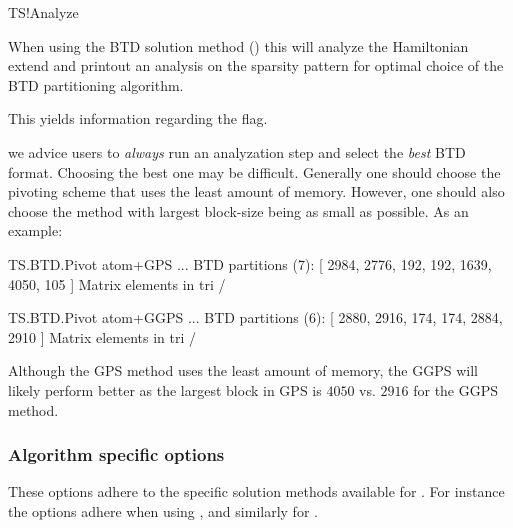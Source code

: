 \begin{fdflogicalF}{TS!Analyze}

  When using the BTD solution method () this
  will analyze the Hamiltonian extend and printout an analysis on the
  sparsity pattern for optimal choice of the BTD partitioning
  algorithm. 

  This yields information regarding the  flag.

  \note we advice users to \emph{always} run an analyzation step and
  select the \emph{best} BTD format. Choosing the best one may be
  difficult. Generally one should choose the pivoting scheme that uses
  the least amount of memory. However, one should also choose the
  method with largest block-size being as small as possible. As an
  example:
  \begin{shellexample}
TS.BTD.Pivot atom+GPS
...
    BTD partitions (7): 
     [ 2984, 2776, 192, 192, 1639, 4050, 105 ]
    Matrix elements in tri / %

TS.BTD.Pivot atom+GGPS
...
    BTD partitions (6): 
     [ 2880, 2916, 174, 174, 2884, 2910 ]
    Matrix elements in tri / %

  \end{shellexample}
  Although the GPS method uses the least amount of memory, the GGPS
  will likely perform better as the largest block in GPS is $4050$
  vs. $2916$ for the GGPS method. 

\end{fdflogicalF}


\subsubsection{Algorithm specific options}

These options adhere to the specific solution methods available for
\tsiesta. For instance the  options adhere when using
, and similarly for .

